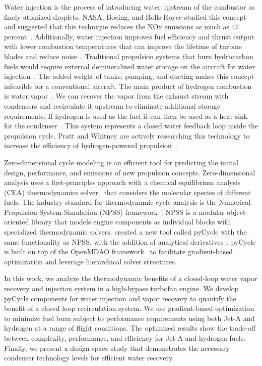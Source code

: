 \documentclass[conf]{new-aiaa}
\begin{document}
Water injection is the process of introducing water upstream of the combustor as finely atomized droplets.
NASA, Boeing, and Rolls-Royce studied this concept and suggested that this technique reduces the NOx emissions as much as 47 percent~\cite{Daggett2010}.
Additionally, water injection improves fuel efficiency and thrust output with lower combustion temperatures that can improve the lifetime of turbine blades and reduce noise~\cite{Daggett2010}.
Traditional propulsion systems that burn hydrocarbon fuels would require external demineralized water storage on the aircraft for water injection~\cite{Mourouzidis2015}.
The added weight of tanks, pumping, and ducting makes this concept infeasible for a conventional aircraft.
The main product of hydrogen combustion is water vapor~\cite{Strom2002}.
We can recover the vapor from the exhaust stream with condensers and recirculate it upstream to eliminate additional storage requirements.
If hydrogen is used as the fuel it can then be used as a heat sink for the condenser~\cite{Boggia2002}.
This system represents a closed water feedback loop inside the propulsion cycle.
Pratt and Whitney are actively researching this technology to increase the efficiency of hydrogen-powered propulsion~\cite{arpa-e_2021}.

Zero-dimensional cycle modeling is an efficient tool for predicting the initial design, performance, and emissions of new propulsion concepts.
Zero-dimensional analysis uses a first-principles approach with a chemical equilibrium analysis (CEA) thermodynamics solver~\cite{Gordon1994} that considers the molecular species of different fuels.
The industry standard for thermodynamic cycle analysis is the Numerical Propulsion System Simulation (NPSS) framework~\cite{JonesNPSS}.
NPSS is a modular object-oriented library that models engine components as individual blocks with specialized thermodynamic solvers.
\citet{Hendricks2019} created a new tool called pyCycle with the same functionality as NPSS, with the addition of analytical derivatives~\cite{Gray2017b}.
pyCycle is built on top of the OpenMDAO framework~\cite{Gray2019a} to facilitate gradient-based optimization and leverage hierarchical solver structures.

In this work, we analyze the thermodynamic benefits of a closed-loop water vapor recovery and injection system in a high-bypass turbofan engine.
We develop pyCycle components for water injection and vapor recovery to quantify the benefit of a closed loop recirculation system.
We use gradient-based optimization to minimize fuel burn subject to performance requirements using both Jet-A and hydrogen at a range of flight conditions.
The optimized results show the trade-off between complexity, performance, and efficiency for Jet-A and hydrogen fuels.
Finally, we present a design space study that demonstrates the necessary condenser technology levels for efficient water recovery.
\end{document}
